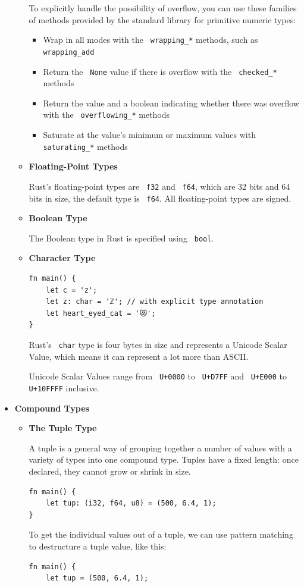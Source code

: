 \documentclass[11pt]{article}
\let\OldTexttt\texttt
\renewcommand{\texttt}[1]{\OldTexttt{\color{MidnightBlue} #1}}
\begin{document}
\begin{itemize}
\begin{itemize}
To explicitly handle the possibility of overflow, you can use these families of methods
provided by the standard library for primitive numeric types:
\begin{itemize}
\item Wrap in all modes with the \texttt{wrapping\_*} methods, such as \texttt{wrapping\_add}
\item Return the \texttt{None} value if there is overflow with the \texttt{checked\_*} methods
\item Return the value and a boolean indicating whether there was overflow with the
\texttt{overflowing\_*} methods
\item Saturate at the value’s minimum or maximum values with \texttt{saturating\_*} methods
\end{itemize}
\item \textbf{Floating-Point Types}

Rust’s floating-point types are \texttt{f32} and \texttt{f64}, which are 32 bits and 64 bits in size, the
default type is \texttt{f64}. All floating-point types are signed.
\item \textbf{Boolean Type}

The Boolean type in Rust is specified using \texttt{bool}.
\item \textbf{Character Type}

\begin{verbatim}
fn main() {
    let c = 'z';
    let z: char = 'ℤ'; // with explicit type annotation
    let heart_eyed_cat = '😻';
}
\end{verbatim}

Rust's \texttt{char} type is four bytes in size and represents a Unicode Scalar Value, which means it
can represent a lot more than ASCII.

Unicode Scalar Values range from \texttt{U+0000} to \texttt{U+D7FF} and \texttt{U+E000} to \texttt{U+10FFFF} inclusive.
\end{itemize}
\item \textbf{Compound Types}
\begin{itemize}
\item \textbf{The Tuple Type}

A tuple is a general way of grouping together a number of values with a variety of types
into one compound type. Tuples have a fixed length: once declared, they cannot grow or
shrink in size.

\begin{verbatim}
fn main() {
    let tup: (i32, f64, u8) = (500, 6.4, 1);
}
\end{verbatim}
To get the individual values out of a tuple, we can use pattern matching to destructure a
tuple value, like this:
\begin{verbatim}
fn main() {
    let tup = (500, 6.4, 1);


\end{verbatim}
\end{itemize}
\end{itemize}
\end{document}
